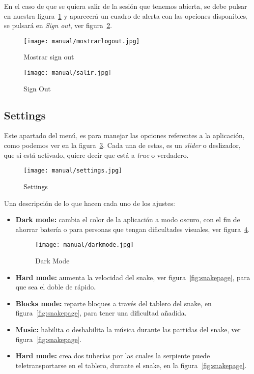 En el caso de que se quiera salir de la sesión que tenemos abierta, se debe pulsar en nuestra figura~\ref{fig:mostrarlogout} y aparecerá un cuadro de alerta con las opciones disponibles, se pulsará en \emph{Sign out}, ver figura~\ref{fig:salir}.

\begin{figure}%
	\centering
	\texttt{[image: manual/mostrarlogout.jpg]}
	\caption{Mostrar sign out}\label{fig:mostrarlogout}
\end{figure}

\begin{figure}%
	\centering
	\texttt{[image: manual/salir.jpg]}
	\caption{Sign Out}\label{fig:salir}
\end{figure}

\subsection{Settings}\label{settings}
Este apartado del menú, es para manejar las opciones referentes a la aplicación, como podemos ver en la figura~\ref{fig:settingspage}. Cada una de estas, es un \emph{slider} o deslizador, que si está activado, quiere decir que está a \emph{true} o verdadero.

\begin{figure}%
	\centering
	\texttt{[image: manual/settings.jpg]}
	\caption{Settings}\label{fig:settingspage}
\end{figure}

Una descripción de lo que hacen cada uno de los ajustes:

\begin{itemize}
	\item \textbf{Dark mode:} cambia el color de la aplicación a modo oscuro, con el fin de ahorrar batería o para personas que tengan dificultades visuales, ver figura~\ref{fig:darkmode}.
	\begin{figure}%
		\centering
		\texttt{[image: manual/darkmode.jpg]}
		\caption{Dark Mode}\label{fig:darkmode}
	\end{figure}
	\item \textbf{Hard mode:} aumenta la velocidad del snake, ver figura~\ref{fig:snakepage}, para que sea el doble de rápido.
	\item \textbf{Blocks mode:} reparte bloques a través del tablero del snake, en figura~\ref{fig:snakepage}, para tener una dificultad añadida.
	\item \textbf{Music:} habilita o deshabilita la música durante las partidas del snake, ver figura~\ref{fig:snakepage}.
	\item \textbf{Hard mode:} crea dos tuberías por las cuales la serpiente puede teletransportarse en el tablero, durante el  snake, en la figura~\ref{fig:snakepage}.
\end{itemize}

